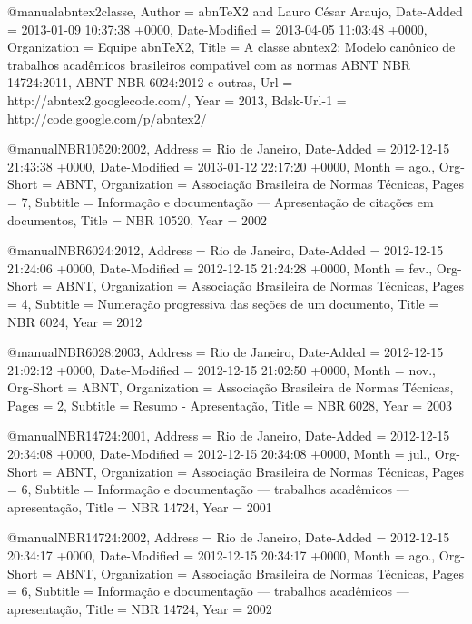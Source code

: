 @manual{abntex2classe,
	Author = {abnTeX2 and Lauro C{\'e}sar Araujo},
	Date-Added = {2013-01-09 10:37:38 +0000},
	Date-Modified = {2013-04-05 11:03:48 +0000},
	Organization = {Equipe abnTeX2},
	Title = {A classe abntex2: Modelo can{\^o}nico de trabalhos acad{\^e}micos brasileiros compat{\'\i}vel com as normas ABNT NBR 14724:2011, ABNT NBR 6024:2012 e outras},
	Url = {http://abntex2.googlecode.com/},
	Year = {2013},
	Bdsk-Url-1 = {http://code.google.com/p/abntex2/}}

@manual{NBR10520:2002,
	Address = {Rio de Janeiro},
	Date-Added = {2012-12-15 21:43:38 +0000},
	Date-Modified = {2013-01-12 22:17:20 +0000},
	Month = {ago.},
	Org-Short = {ABNT},
	Organization = {Associa{\c c}\~ao Brasileira de Normas T\'ecnicas},
	Pages = 7,
	Subtitle = {Informa{\c c}\~ao e documenta{\c c}\~ao --- Apresenta{\c c}\~ao de cita{\c c}\~oes em documentos},
	Title = {{NBR} 10520},
	Year = 2002}

@manual{NBR6024:2012,
	Address = {Rio de Janeiro},
	Date-Added = {2012-12-15 21:24:06 +0000},
	Date-Modified = {2012-12-15 21:24:28 +0000},
	Month = {fev.},
	Org-Short = {ABNT},
	Organization = {Associa{\c c}\~ao Brasileira de Normas T\'ecnicas},
	Pages = 4,
	Subtitle = {Numera{\c c}\~ao progressiva das se{\c c}\~oes de um documento},
	Title = {{NBR} 6024},
	Year = 2012}

@manual{NBR6028:2003,
	Address = {Rio de Janeiro},
	Date-Added = {2012-12-15 21:02:12 +0000},
	Date-Modified = {2012-12-15 21:02:50 +0000},
	Month = {nov.},
	Org-Short = {ABNT},
	Organization = {Associa{\c c}\~ao Brasileira de Normas T\'ecnicas},
	Pages = 2,
	Subtitle = {Resumo - Apresenta{\c c}{\~a}o},
	Title = {{NBR} 6028},
	Year = 2003}

@manual{NBR14724:2001,
	Address = {Rio de Janeiro},
	Date-Added = {2012-12-15 20:34:08 +0000},
	Date-Modified = {2012-12-15 20:34:08 +0000},
	Month = {jul.},
	Org-Short = {ABNT},
	Organization = {Associa{\c c}\~ao Brasileira de Normas T\'ecnicas},
	Pages = 6,
	Subtitle = {Informa{\c c}\~ao e documenta{\c c}\~ao --- trabalhos acad\^emicos --- apresenta{\c c}\~ao},
	Title = {{NBR} 14724},
	Year = 2001}

@manual{NBR14724:2002,
	Address = {Rio de Janeiro},
	Date-Added = {2012-12-15 20:34:17 +0000},
	Date-Modified = {2012-12-15 20:34:17 +0000},
	Month = {ago.},
	Org-Short = {ABNT},
	Organization = {Associa{\c c}\~ao Brasileira de Normas T\'ecnicas},
	Pages = 6,
	Subtitle = {Informa{\c c}\~ao e documenta{\c c}\~ao --- trabalhos acad\^emicos --- apresenta{\c c}\~ao},
	Title = {{NBR} 14724},
	Year = 2002}

